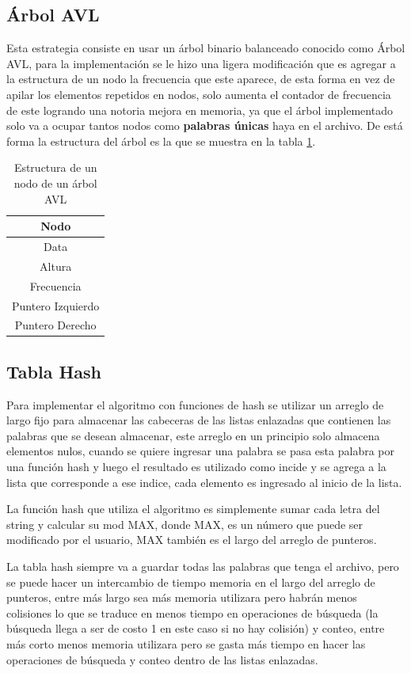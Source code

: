 \documentclass[12pt,letterpaper]{scrartcl}
\begin{document}
\subsection{Árbol AVL}

Esta estrategia consiste en usar un árbol binario balanceado conocido como Árbol AVL, para la implementación se le hizo una ligera modificación que es agregar a la estructura de un nodo la frecuencia que este aparece, de esta forma en vez de apilar los elementos repetidos en nodos, solo aumenta el contador de frecuencia de este logrando una notoria mejora en memoria, ya que el árbol implementado solo va a ocupar tantos nodos como \textbf{palabras únicas} haya en el archivo. De está forma la estructura del árbol es la que se muestra en la tabla \ref{table:nodo}.

\begin{table}[!h]
\centering
\caption{Estructura de un nodo de un árbol AVL}
\label{table:nodo}
\begin{tabular}{|c|}
\hline 
\textbf{Nodo} \\ 
\hline 
Data \\ 
\hline
Altura\\ 
\hline
Frecuencia\\ 
\hline 
Puntero Izquierdo\\ 
\hline
Puntero Derecho\\ 
\hline
\end{tabular} 
\end{table}

\subsection{Tabla Hash}

Para implementar el algoritmo con funciones de hash se utilizar un arreglo de largo fijo para almacenar las cabeceras de las listas enlazadas que contienen las palabras que se desean almacenar, este arreglo en un principio solo almacena elementos nulos, cuando se quiere ingresar una palabra se pasa esta palabra por una función hash y luego el resultado es utilizado como incide y se agrega a la lista que corresponde a ese indice, cada elemento es ingresado al inicio de la lista.

La función hash que utiliza el algoritmo es simplemente sumar cada letra del string y calcular su mod MAX, donde MAX, es un número que puede ser modificado por el usuario, MAX también es el largo del arreglo de punteros.

La tabla hash siempre va a guardar todas las palabras que tenga el archivo, pero se puede hacer un intercambio de tiempo memoria en el largo del arreglo de punteros, entre más largo sea más memoria utilizara pero habrán menos colisiones lo que se traduce en menos tiempo en operaciones de búsqueda (la búsqueda llega a ser de costo 1 en este caso si no hay colisión) y conteo, entre más corto menos memoria utilizara pero se gasta más tiempo en hacer las operaciones de búsqueda y conteo dentro de las listas enlazadas.
\end{document}
